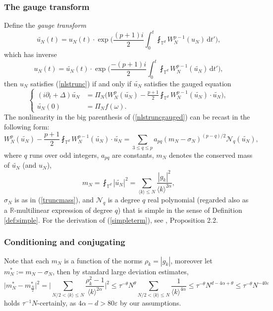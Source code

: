 \documentclass[11 pt,reqno]{amsart}
\theoremstyle{definition}
\theoremstyle{remark}
\numberwithin{equation}{section}
\newcommand{\Nc}{\mathcal{N}}
\newcommand{\Tb}{\mathbb{T}}
\newcommand{\Rb}{\mathbb{R}}
\begin{document}
{\subsubsection{The gauge transform}\label{gauging} Define the \emph{gauge transform}
\begin{equation}\label{gauge}\widetilde{u_N}(t)=u_N(t)\cdot\exp\bigg(\frac{(p+1)i}{2}\int_0^t\fint_{\Tb^d}W_N^{p-1}(u_N)\,\mathrm{d}t'\bigg),
\end{equation} which has inverse
\begin{equation}\label{gaugeinv}u_N(t)=\widetilde{u_N}(t)\cdot\exp\bigg(\frac{-(p+1)i}{2}\int_0^t\fint_{\Tb^d}W_N^{p-1}(\widetilde{u_N})\,\mathrm{d}t'\bigg),
\end{equation} then $u_N$ satisfies (\ref{nlstrunc}) if and only if $\widetilde{u_N}$ satisfies the gauged equation
\begin{equation}\label{nlstruncgauged}
\left\{
\begin{aligned}(i\partial_t+\Delta)\widetilde{u_N}&=\Pi_N\bigg(W_N^{p}(\widetilde{u_N})-\frac{p+1}{2}\fint_{\Tb^d}W_N^{p-1}(\widetilde{u_N})\cdot \widetilde{u_N}\bigg),\\
\widetilde{u_N}(0)&=\Pi_Nf(\omega).
\end{aligned}
\right.
\end{equation} The nonlinearity in the big parenthesis of (\ref{nlstruncgauged}) can be recast in the following form:
\begin{equation}\label{simpleterm}W_N^{p}(\widetilde{u_N})-\frac{p+1}{2}\fint_{\Tb^d}W_N^{p-1}(\widetilde{u_N})\cdot \widetilde{u_N}=\sum_{3\leq q\leq p}a_{pq}(m_N-\sigma_N)^{(p-q)/2}\Nc_q(\widetilde{u_N}),\end{equation} where $q$ runs over odd integers, $a_{pq}$ are constants, $m_N$ denotes the conserved mass of $\widetilde{u_N}$ (and $u_N$),
\[m_N=\fint_{\Tb^d}|\widetilde{u_N}|^2=\sum_{\langle k\rangle\leq N}\frac{|g_k|^2}{\langle k\rangle^{2\alpha}},\] $\sigma_N$ is as in (\ref{truncmass}), and $\Nc_q$ is a degree $q$ real polynomial (regarded also as a $\Rb$-multilinear expression of degree $q$) that is simple in the sense of Definition \ref{def:simple}. For the derivation of (\ref{simpleterm}), see \cite{DNY}, Proposition 2.2.
\subsubsection{Conditioning and conjugating}\label{condition1}
Note that each $m_N$ is a function of the norms $\rho_k=|g_k|$, moreover let $m_N^*:=m_N-\sigma_N$, then by standard large deviation estimates,
\begin{equation}\label{devmass}\big|m_N^*-m_{\frac{N}{2}}^*\big|^2=\bigg|\sum_{N/2<\langle k\rangle\leq N}\frac{\rho_k^2-1}{\langle k\rangle^{2\alpha}}\bigg|^2\leq\tau^{-\theta}N^\theta\sum_{N/2<\langle k\rangle\leq N}\frac{1}{\langle k\rangle^{4\alpha}}\leq \tau^{-\theta} N^{d-4\alpha+\theta}\leq \tau^{-\theta}N^{-40\varepsilon}\end{equation} holds $\tau^{-1}N$-certainly, as $4\alpha-d>80\varepsilon$ by our assumptions.

}
\end{document}
